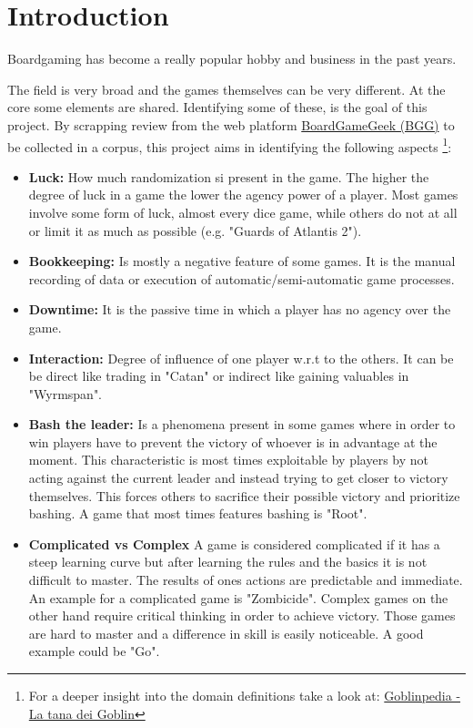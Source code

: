 \section{Introduction}

Boardgaming has become a really popular hobby and business in the past years.

The field is very broad and the games themselves can be very different.
At the core some elements are shared. Identifying some of these, is the goal of this project.
By scrapping review from the web platform \href{https://boardgamegeek.com/}{BoardGameGeek (BGG)}
to be collected in a corpus, this project aims in identifying the following aspects
\footnote{For a deeper insight into the domain definitions take a look at: \href{https://www.goblins.net/goblinpedia}{Goblinpedia - La tana dei Goblin}}:
\begin{itemize}
    \item{\textbf{Luck:}} How much randomization si present in the game.
    The higher the degree of luck in a game the lower the agency power of a player.
    Most games involve some form of luck, almost every dice game, while others do not at all or limit it as much as possible (e.g. "Guards of Atlantis 2").

    \item{\textbf{Bookkeeping:}} Is mostly a negative feature of some games.
    It is the manual recording of data or execution of automatic/semi-automatic game processes.

    \item{\textbf{Downtime:}} It is the passive time in which a player has no agency over the game.

    \item{\textbf{Interaction:}} Degree of influence of one player w.r.t to the others.
    It can be be direct like trading in "Catan" or indirect like gaining valuables in "Wyrmspan".

    \item{\textbf{Bash the leader:}} Is a phenomena present in some games where in order to win players
    have to prevent the victory of whoever is in advantage at the moment.
    This characteristic is most times exploitable by players by not acting against the current leader and instead
    trying to get closer to victory themselves.
    This forces others to sacrifice their possible victory and prioritize bashing.
    A game that most times features bashing is "Root".

    \item{\textbf{Complicated vs Complex}} A game is considered complicated if it has a steep learning curve
    but after learning the rules and the basics it is not difficult to master.
    The results of ones actions are predictable and immediate.
    An example for a complicated game is "Zombicide".
    Complex games on the other hand require critical thinking in order to achieve victory.
    Those games are hard to master and a difference in skill is easily noticeable. A good example could be "Go".
\end{itemize}

